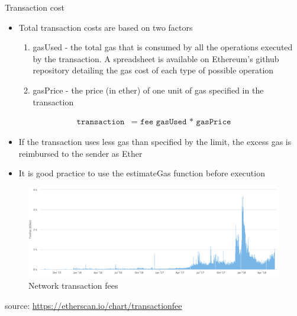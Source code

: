 \documentclass[10pt]{beamer}
\begin{document}
\begin{frame}{Transaction cost}
	\begin{itemize}
		\item Total transaction costs are based on two factors
		\begin{enumerate}
			\item gasUsed - the total gas that is consumed by all the operations executed by the transaction. A spreadsheet is available on Ethereum's github repository detailing the gas cost of each type of possible operation
			\item gasPrice - the price (in ether) of one unit of gas specified in the transaction
		\end{enumerate}
	\end{itemize}
	\begin{align*}
		\texttt{transaction} & \texttt{= fee gasUsed * gasPrice}
	\end{align*}
	\begin{itemize}
		\item If the transaction uses less gas than specified by the limit, the excess gas is reimbursed to the sender as Ether
		\item It is good practice to use the estimateGas function before execution
	\end{itemize}
\end{frame}


\begin{frame}
	\begin{figure}[]
		\centering
		\includegraphics  [scale=0.25]{Images/eth-fee}
		\caption{Network transaction fees}
	\end{figure}
	\begin{scriptsize}
		source: \href{https://etherscan.io/chart/transactionfee}{https://etherscan.io/chart/transactionfee}
	\end{scriptsize}
\end{frame}
\end{document}

